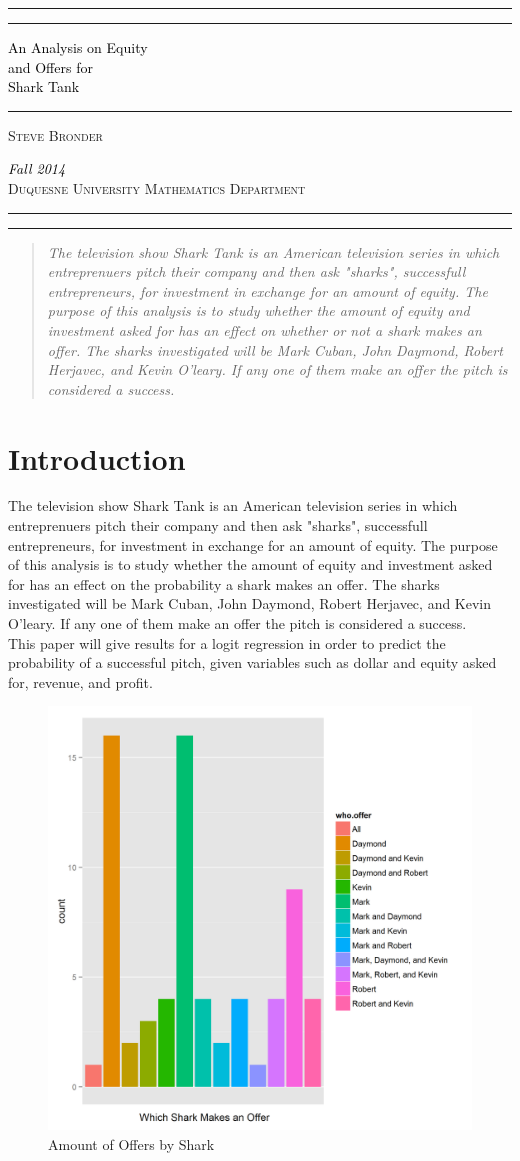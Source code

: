 \documentclass[11pt]{article}\usepackage[]{graphicx}\usepackage[]{color}
\newcommand*{\titleAT}{\begingroup %
\newlength{\drop} %
\drop=0.1\textheight %

\rule{\textwidth}{1pt}\par %
\vspace{2pt}\vspace{-\baselineskip} %
\rule{\textwidth}{0.4pt}\par %

\vspace{\drop} %
\centering %
\textcolor{black}{ %
{\Huge An Analysis on Equity}\\[0.5\baselineskip] %
{\Huge and Offers for }\\[0.5\baselineskip] %
{\Huge Shark Tank}} %

\vspace{0.25\drop} %
\rule{0.3\textwidth}{0.4pt}\par %
\vspace{\drop} %

{\Large \textsc{Steve Bronder}}\par %

\vfill %
{\large \textcolor{black}{\textit{Fall 2014}}}\\[0.5\baselineskip] %
{\large \textsc{Duquesne University Mathematics Department}}\par %

\vspace*{\drop} %

\rule{\textwidth}{0.4pt}\par %
\vspace{2pt}\vspace{-\baselineskip} %
\rule{\textwidth}{1pt}\par %

\endgroup}
\begin{document}
\titleAT
\clearpage
\newpage
{}
\setcounter{page}{1}

\begin{abstract}
\emph{The television show Shark Tank is an American television series in which entreprenuers pitch their company and then ask "sharks", successfull entrepreneurs, for investment in exchange for an amount of equity. The purpose of this analysis is to study whether the amount of equity and investment asked for has an effect on whether or not a shark makes an offer. The sharks investigated will be Mark Cuban, John Daymond, Robert Herjavec, and Kevin O'leary. If any one of them make an offer the pitch is considered a success.
}
 
\end{abstract}
\newpage
\section{Introduction}
The television show Shark Tank is an American television series in which entreprenuers pitch their company and then ask "sharks", successfull entrepreneurs, for investment in exchange for an amount of equity. The purpose of this analysis is to study whether the amount of equity and investment asked for has an effect on the probability a shark makes an offer. The sharks investigated will be Mark Cuban, John Daymond, Robert Herjavec, and Kevin O'leary. If any one of them make an offer the pitch is considered a success.\\

This paper will give results for a logit regression in order to predict the probability of a successful pitch, given variables such as dollar and equity asked for, revenue, and profit. 



\begin{figure}[ht]
  \begin{center}
  \caption{Amount of Offers by Shark}
    \includegraphics[width=1.0\textwidth]{figure_offer.png}
    \end{center}
\end{figure}
\end{document}
